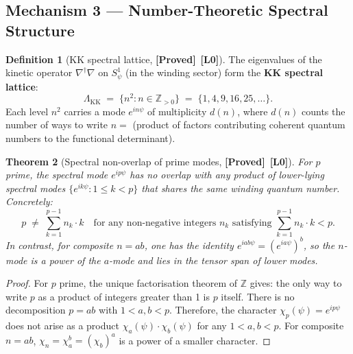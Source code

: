 \documentclass[12pt,a4paper]{article}
\newtheorem{theorem}{Theorem}[section]
\theoremstyle{definition}
\newtheorem{definition}[theorem]{Definition}
\theoremstyle{remark}
\newcommand{\ZZ}{\mathbb{Z}}
\newcommand{\PROVED}{\textbf{[Proved]}}
\newcommand{\Lzero}{\textbf{[L0]}}
\begin{document}
\subsection{Mechanism 3 — Number-Theoretic Spectral Structure}
\label{sec:psp:numbertheory}

\begin{definition}[KK spectral lattice, \PROVED\ \Lzero]
\label{def:psp:lattice}
The eigenvalues of the kinetic operator $\nabla^\dagger\nabla$ on $S^1_\psi$
(in the winding sector) form the \textbf{KK spectral lattice}:
\begin{equation}
  \Lambda_{\mathrm{KK}} \;=\; \{n^2 : n \in \ZZ_{>0}\}
  \;=\; \{1, 4, 9, 16, 25, \ldots\}.
  \label{eq:psp:lattice}
\end{equation}
Each level $n^2$ carries a mode $e^{in\psi}$ of multiplicity $d(n)$, where $d(n)$
counts the number of ways to write $n = $ (product of factors contributing coherent
quantum numbers to the functional determinant).
\end{definition}

\begin{theorem}[Spectral non-overlap of prime modes, \PROVED\ \Lzero]
\label{thm:psp:spectral}
For $p$ prime, the spectral mode $e^{ip\psi}$ has no overlap with any product
of lower-lying spectral modes $\{e^{ik\psi} : 1 \leq k < p\}$ that shares the
same winding quantum number.  Concretely:
\begin{equation}
  p \;\neq\; \sum_{k=1}^{p-1} n_k \cdot k
  \quad \text{for any non-negative integers } n_k
  \text{ satisfying } \sum_{k=1}^{p-1} n_k \cdot k < p.
  \label{eq:psp:nooverlap}
\end{equation}
In contrast, for composite $n = ab$, one has the identity
$e^{iab\psi} = (e^{ia\psi})^b$, so the $n$-mode is a power of the $a$-mode and
lies in the tensor span of lower modes.
\end{theorem}

\begin{proof}
For $p$ prime, the unique factorisation theorem of $\ZZ$ gives: the only way to
write $p$ as a product of integers greater than 1 is $p$ itself.  There is no
decomposition $p = ab$ with $1 < a,b < p$.  Therefore, the character
$\chi_p(\psi) = e^{ip\psi}$ does not arise as a product $\chi_a(\psi)\cdot\chi_b(\psi)$
for any $1 < a,b < p$.  For composite $n = ab$, $\chi_n = \chi_a^b = (\chi_b)^a$
is a power of a smaller character.
\end{proof}
\end{document}
